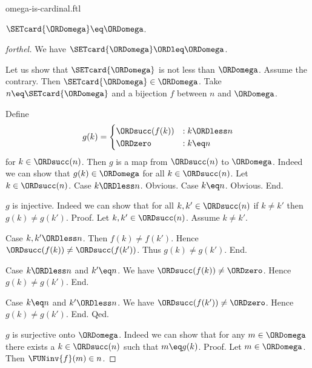 \documentclass{naproche-library}
\begin{document}
\begin{smodule}[title=$\omega$ is a Cardinal Number]{omega-is-cardinal.ftl}

\begin{proposition}[forthel,id=SET_THEORY_07_4952029518626816]
  $\SETcard{\ORDomega} \eq \ORDomega$.
\end{proposition}
\begin{proof}[forthel]
  We have $\SETcard{\ORDomega} \ORDleq \ORDomega$.

  Let us show that $\SETcard{\ORDomega}$ is not less than $\ORDomega$.
    Assume the contrary.
    Then $\SETcard{\ORDomega} \in \ORDomega$.
    Take $n \eq \SETcard{\ORDomega}$ and a bijection $f$ between $n$ and $\ORDomega$.

    Define \[ g(k) =
      \begin{cases}
        \ORDsucc(f(k)) & : k \ORDless n
        \\
        \ORDzero           & : k \eq n
      \end{cases} \]
    for $k \in \ORDsucc(n)$.
    Then $g$ is a map from $\ORDsucc(n)$ to $\ORDomega$.
    Indeed we can show that $g(k) \in \ORDomega$ for all $k \in \ORDsucc(n)$.
      Let $k \in \ORDsucc(n)$.
      Case $k \ORDless n$. Obvious.
      Case $k \eq n$. Obvious.
    End.

    $g$ is injective.
    Indeed we can show that for all $k, k' \in \ORDsucc(n)$ if $k \neq k'$
    then $g(k) \neq g(k')$. \newline
    Proof.
      Let $k, k' \in \ORDsucc(n)$.
      Assume $k \neq k'$.

      Case $k, k' \ORDless n$.
        Then $f(k) \neq f(k')$.
        Hence $\ORDsucc(f(k)) \neq \ORDsucc(f(k'))$.
        Thus $g(k) \neq g(k')$.
      End.

      Case $k \ORDless n$ and $k' \eq n$.
        We have $\ORDsucc(f(k)) \neq \ORDzero$.
        Hence $g(k) \neq g(k')$.
      End.

      Case $k \eq n$ and $k' \ORDless n$.
        We have $\ORDsucc(f(k')) \neq \ORDzero$.
        Hence $g(k) \neq g(k')$.
      End.
    Qed.

    $g$ is surjective onto $\ORDomega$.
    Indeed we can show that for any $m \in \ORDomega$ there exists a $k \in \ORDsucc(n)$ such that $m \eq g(k)$. \newline
    Proof.
      Let $m \in \ORDomega$.
      Then $\FUNinv{f}(m) \in n$.


\end{proof}
\end{smodule}
\end{document}
